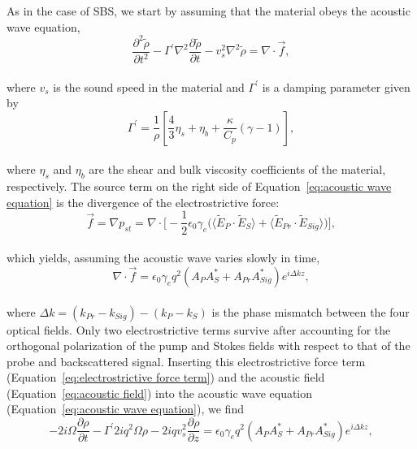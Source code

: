 As in the case of SBS\cite{boyd2020nonlinear}, we start by assuming that the material obeys the acoustic wave equation,
\\
\begin{equation}
    \frac{\partial^{2}\tilde{\rho}}{\partial t^{2}} - \Gamma^{\prime}\nabla^{2}\frac{\partial\tilde{\rho}}{\partial t} - v_{s}^{2}\nabla^{2}\tilde{\rho} = \nabla\cdot\vec{f},
    \label{eq:acoustic wave equation}
\end{equation}
\\
\noindent where \(v_{s}\) is the sound speed in the material and \(\Gamma^{\prime}\) is a damping parameter given by
\\
\begin{equation}
    \Gamma^{\prime} = \frac{1}{\rho}\left[\frac{4}{3}\eta_{s} + \eta_{b} + \frac{\kappa}{C_{p}}(\gamma - 1)\right],
\end{equation}
\\
\noindent where \(\eta_{s}\) and \(\eta_{b}\) are the shear and bulk viscosity coefficients of the material, respectively. The source term on the right side of Equation~\ref{eq:acoustic wave equation} is the divergence of the electrostrictive force:
\\
\begin{equation}
    \vec{f} = \nabla p_{st} = \nabla \cdot \Bigg[-\frac{1}{2}\epsilon_{0}\gamma_{e}\Big(\langle\tilde{E}_{P} \cdot \tilde{E}_{S}\rangle + \langle\tilde{E}_{Pr} \cdot \tilde{E}_{Sig}\rangle\Big)\Bigg],
\end{equation}
\\
which yields, assuming the acoustic wave varies slowly in time,
\\
\begin{equation}
    \nabla\cdot\vec{f} = \epsilon_{0}\gamma_{e}q^{2}(A_{P}A_{S}^{*} + A_{Pr}A_{Sig}^{*})e^{i\Delta kz},
    \label{eq:electrostrictive force term}
\end{equation}
\\
where \(\Delta k = (k_{Pr} - k_{Sig}) - (k_{P} - k_{S})\) is the phase mismatch between the four optical fields. Only two electrostrictive terms survive after accounting for the orthogonal polarization of the pump and Stokes fields with respect to that of the probe and backscattered signal. Inserting this electrostrictive force term (Equation~\ref{eq:electrostrictive force term}) and the acoustic field (Equation~\ref{eq:acoustic field}) into the acoustic wave equation (Equation~\ref{eq:acoustic wave equation}), we find
\\
\begin{equation}
    -2i\Omega\frac{\partial\rho}{\partial t} - \Gamma^{\prime}2iq^{2}\Omega\rho - 2iqv_{s}^{2}\frac{\partial\rho}{\partial z} = \epsilon_{0}\gamma_{e}q^{2}(A_{P}A_{S}^{*} + A_{Pr}A_{Sig}^{*})e^{i\Delta kz},
\end{equation}
